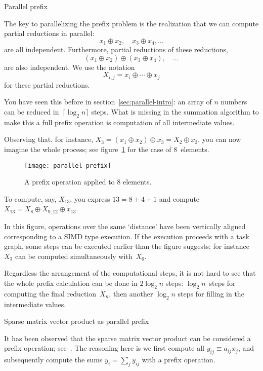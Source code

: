  {Parallel prefix}

The key to parallelizing the prefix problem
is the realization that we can compute 
partial reductions in parallel:
\[ x_1\oplus x_2, \quad x_3\oplus x_4, \ldots \]
are all independent.
Furthermore, partial reductions of these reductions,
\[ (x_1\oplus x_2) \oplus (x_3\oplus x_4),\quad \ldots \]
are also independent. We use the notation 
\[ X_{i,j}=x_i\oplus\cdots\oplus x_j \]
for these partial reductions.

You have seen this before in section~\ref{sec:parallel-intro}:
an array of $n$ numbers can be reduced in~$\lceil \log_2 n\rceil$ 
steps.
What is missing in the summation algorithm
to make this a full prefix operation
is computation of all intermediate values. 

Observing that, for instance, $X_3=(x_1\oplus x_2)\oplus x_3=X_2\oplus x_3$,
you can now imagine the whole process; see figure~\ref{fig:prefix}
for the case of $8$~elements.
\begin{figure}[ht]
  \texttt{[image: parallel-prefix]}
  \caption{A prefix operation applied to 8 elements.}
  \label{fig:prefix}
\end{figure}
To compute, say, $X_{13}$, you express $13=8+4+1$ and compute
$X_{13}=X_8\oplus X_{9,12} \oplus x_{13}$.

In this figure, operations over the same `distance' have been
vertically aligned corresponding to a \ac{SIMD} type execution.
If the execution proceeds with a task graph, some steps can be
executed earlier than the figure suggests; for instance $X_3$ can be
computed simultaneously with~$X_6$.

Regardless the arrangement of the computational steps,
it is not hard to see that the whole prefix calculation
can be done in $2\log_2n$ steps: $\log_2 n$~steps for 
computing the final reduction~$X_n$, then another $\log_2 n$
steps for filling in the intermediate values.

 {Sparse matrix vector product as parallel prefix}
\label{sec:spmvp-prefix}

It has been observed that the sparse matrix vector product can be considered a prefix operation; 
see~\cite{Blelloc:segmented-report}.
The reasoning here is we first compute all $y_{ij}\equiv a_{ij}x_j$, and subsequently
compute the sums $y_i=\sum_j y_{ij}$ with a prefix operation.

